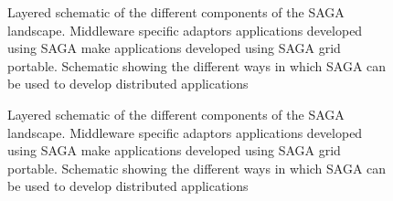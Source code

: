 \documentclass[conference,final]{IEEEtran}
\begin{document}
\begin{figure}[!h]
  \begin{center}
  \end{center}
  \caption{Layered schematic of the different components of the SAGA
    landscape.  Middleware specific adaptors applications developed
    using SAGA make applications developed using SAGA grid
    portable. Schematic showing the different ways in which SAGA can
    be used to develop distributed applications}
 \label{sagalayer}
\end{figure}


\begin{figure}[!h]
  \begin{center}
  \end{center}
  \caption{Layered schematic of the different components of the SAGA
    landscape.  Middleware specific adaptors applications developed
    using SAGA make applications developed using SAGA grid
    portable. Schematic showing the different ways in which SAGA can
    be used to develop distributed applications}
 \label{sagalayer}
\end{figure}
\end{document}
